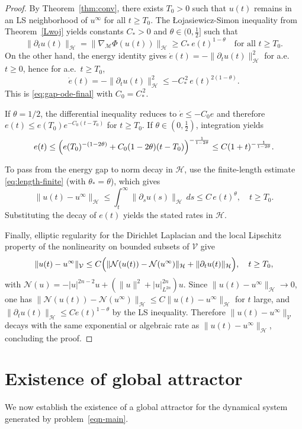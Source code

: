 \documentclass[reqno]{amsart}
\begin{document}
\begin{proof}
By Theorem~\ref{thm:conv}, there exists $T_0>0$ such that $u(t)$ remains in an LS neighborhood of
$u^\infty$ for all $t\ge T_0$. The \L{o}jasiewicz-Simon inequality from Theorem~\ref{Lwoj} yields
constants $C_*>0$ and $\theta\in(0,\tfrac12]$ such that
\[
\|\partial_t u(t)\|_{\mathcal H}
=\|\nabla_{\!\mathcal M}\Phi(u(t))\|_{\mathcal H}
\ge C_*\,e(t)^{1-\theta}
\quad\text{for all }t\ge T_0.
\]
On the other hand, the energy identity gives $\dot e(t)=-\|\partial_t u(t)\|_{\mathcal H}^2$ for
a.e.\ $t\ge 0$, hence for a.e.\ $t\ge T_0$,
\[
\dot e(t)=-\|\partial_t u(t)\|_{\mathcal H}^2\le -C_*^{\,2}\,e(t)^{2(1-\theta)}.
\]
This is \eqref{eq:gap-ode-final} with $C_0=C_*^{\,2}$.

If $\theta=1/2$, the differential inequality reduces to $\dot e\le -C_0 e$ and therefore
$e(t)\le e(T_0)e^{-C_0(t-T_0)}$ for $t\ge T_0$. If $\theta\in(0,\tfrac12)$, integration
yields
\[
e(t)\le \Bigl(e(T_0)^{-(1-2\theta)}+C_0(1-2\theta)(t-T_0)\Bigr)^{-\frac{1}{1-2\theta}}
\le C(1+t)^{-\frac{1}{1-2\theta}}.
\]

To pass from the energy gap to norm decay in $\mathcal H$, use the finite-length estimate
\eqref{eq:length-finite} (with $\theta_*=\theta$), which gives
\[
\|u(t)-u^\infty\|_{\mathcal H}\le \int_t^\infty \|\partial_s u(s)\|_{\mathcal H}\,ds
\le C\,e(t)^\theta,
\quad t\ge T_0.
\]
Substituting the decay of $e(t)$ yields the stated rates in $\mathcal H$.

Finally, elliptic regularity for the Dirichlet Laplacian and the local Lipschitz property of the
nonlinearity on bounded subsets of $\mathcal V$ give
\[
\|u(t)-u^\infty\|_{\mathcal V}
\le C\Bigl(\|\mathcal N(u(t))-\mathcal N(u^\infty)\|_{\mathcal H}
+\|\partial_t u(t)\|_{\mathcal H}\Bigr),
\quad t\ge T_0,
\]
with $\mathcal N(u)=-|u|^{2n-2}u+(\|u\|^2+|u|_{L^{2n}}^{2n})u$. Since
$\|u(t)-u^\infty\|_{\mathcal H}\to 0$, one has
$\|\mathcal N(u(t))-\mathcal N(u^\infty)\|_{\mathcal H}\le C\|u(t)-u^\infty\|_{\mathcal H}$ for
$t$ large, and $\|\partial_t u(t)\|_{\mathcal H}\le C e(t)^{1-\theta}$ by the LS inequality.
Therefore $\|u(t)-u^\infty\|_{\mathcal V}$ decays with the same exponential or algebraic rate as
$\|u(t)-u^\infty\|_{\mathcal H}$, concluding the proof.
\end{proof}

\section{Existence of global attractor}
We now establish the existence of a global attractor for the dynamical system
generated by problem~\eqref{eqn-main}.
\end{document}
